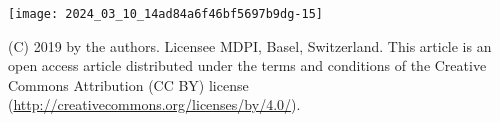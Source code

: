 \documentclass[10pt]{article}
\begin{document}
\begin{center}
\texttt{[image: 2024\_03\_10\_14ad84a6f46bf5697b9dg-15]}
\end{center}

(C) 2019 by the authors. Licensee MDPI, Basel, Switzerland. This article is an open access article distributed under the terms and conditions of the Creative Commons Attribution (CC BY) license (\href{http://creativecommons.org/licenses/by/4.0/}{http://creativecommons.org/licenses/by/4.0/}).
\end{document}
